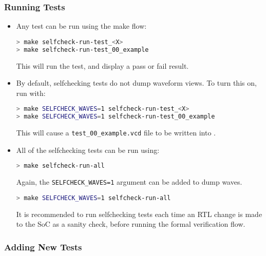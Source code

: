 \subsubsection{Running Tests}

\begin{itemize}

\item Any test can be run using the make flow:

\begin{lstlisting}[language=bash,style=block]
> make selfcheck-run-test_<X>
> make selfcheck-run-test_00_example
\end{lstlisting}

    This will run the test, and display a pass or fail result.

\item By default, selfchecking tests do not dump waveform views.
    To turn this on, run with:

\begin{lstlisting}[language=bash,style=block]
> make SELFCHECK_WAVES=1 selfcheck-run-test_<X>
> make SELFCHECK_WAVES=1 selfcheck-run-test_00_example
\end{lstlisting}

    This will cause a {\tt test\_00\_example.vcd} file to be written into
    .

\item All of the selfchecking tests can be run using:

\begin{lstlisting}[language=bash,style=block]
> make selfcheck-run-all
\end{lstlisting}

    Again, the {\tt SELFCHECK\_WAVES=1} argument can be added to dump waves.

\begin{lstlisting}[language=bash,style=block]
> make SELFCHECK_WAVES=1 selfcheck-run-all
\end{lstlisting}

    It is recommended to run selfchecking tests each time an RTL
    change is made to the SoC as a sanity check, before running the
    formal verification flow.

\end{itemize}


\subsubsection{Adding New Tests}

